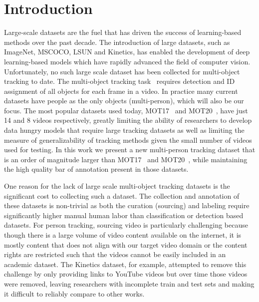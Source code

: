 \documentclass[runningheads]{llncs}
\begin{document}
\section{Introduction}
Large-scale datasets are the fuel that has driven the success of learning-based methods over the past decade.
The introduction of large datasets, such as ImageNet\cite{imagenet}, MSCOCO\cite{mscoco}, LSUN\cite{lsun} and Kinetics\cite{kinetics}, has enabled the development of deep learning-based models which have rapidly advanced the field of computer vision. 
Unfortunately, no such large scale dataset has been collected for multi-object tracking to date. The multi-object tracking task~\cite{sort,sort2,centertrack,siammot,fairmot,tubetk} requires detection and ID assignment of all objects for each frame in a video. In practice many current datasets have people as the only objects (multi-person), which will also be our focus.
The most popular datasets used today, MOT17~\cite{mot} and MOT20~\cite{mot20}, have just 14 and 8 videos respectively, greatly limiting the ability of researchers to develop data hungry models that require large tracking datasets as well as limiting the measure of generalizability of tracking methods given the small number of videos used for testing. 
In this work we present a new multi-person tracking dataset that is an order of magnitude larger than MOT17~\cite{mot} and MOT20~\cite{mot20}, while maintaining the high quality bar of annotation present in those datasets. 


One reason for the lack of large scale multi-object tracking datasets is the significant cost to collecting such a dataset. The collection and annotation of these datasets is non-trivial as both the curation (sourcing) and labeling require significantly higher manual human labor than classification or detection based datasets.  
For person tracking, sourcing video is particularly challenging because though there is a large volume of video content available on the internet, it is mostly content that does not align with our target video domain or the content rights are restricted such that the videos cannot be easily included in an academic dataset. The Kinetics\cite{kinetics} dataset, for example, attempted to remove this challenge by only providing links to YouTube videos but over time those videos were removed, leaving researchers with incomplete train and test sets and making it difficult to reliably compare to other works.
\end{document}
